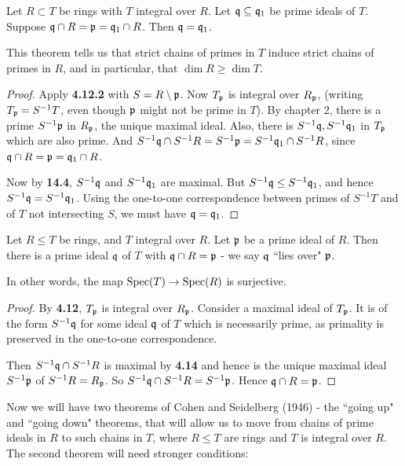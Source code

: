 \documentclass[10pt,a4paper]{article}
\begin{document}
\begin{theorem}
  Let $R \subset T$ be rings with $T$ integral over $R$. Let $\mathfrak{q} \subseteq \mathfrak{q}_1$ be prime ideals of $T$. Suppose $\mathfrak{q}\cap R = \mathfrak{p} = \mathfrak{q}_1 \cap R$. Then $\mathfrak{q}=\mathfrak{q}_1$.
\end{theorem}
This theorem tells us that strict chains of primes in $T$ induce strict chains of primes in $R$, and in particular, that $\dim R \geq \dim T$.
\begin{proof}
  Apply \textbf{4.12.2} with $S = R \setminus \mathfrak{p}$. Now $T_{\mathfrak{p}}$ is integral over $R_{\mathfrak{p}}$, (writing $T_{\mathfrak{p}} = S^{-1}T$, even though $\mathfrak{p}$ might not be prime in $T$). By chapter 2, there is a prime $S^{-1}\mathfrak{p}$ in $R_{\mathfrak{p}}$, the unique maximal ideal. Also, there is $S^{-1}\mathfrak{q}, S^{-1}\mathfrak{q}_1$ in $T_{\mathfrak{p}}$ which are also prime. And $S^{-1}\mathfrak{q}\cap S^{-1}R = S^{-1}\mathfrak{p} = S^{-1}\mathfrak{q}_1\cap S^{-1}R$, since $\mathfrak{q}\cap R =\mathfrak{p} = \mathfrak{q}_1 \cap R$.

  Now by \textbf{14.4}, $S^{-1}\mathfrak{q}$ and $S^{-1}\mathfrak{q}_1$ are maximal. But $S^{-1}\mathfrak{q} \leq S^{-1}\mathfrak{q}_1$, and hence $S^{-1}\mathfrak{q}= S^{-1}\mathfrak{q}_1$. Using the one-to-one correspondence between primes of $S^{-1}T$ and of $T$ not intersecting $S$, we must have $\mathfrak{q}=\mathfrak{q}_1$.
\end{proof}
\begin{theorem}
  Let $R \leq T$ be rings, and $T$ integral over $R$. Let $\mathfrak{p}$ be a prime ideal of $R$. Then there is a prime ideal $\mathfrak{q}$ of $T$ with $\mathfrak{q} \cap R =\mathfrak{p}$ - we say $\mathfrak{q}$ ``lies over" $\mathfrak{p}$.

  In other words, the map $\operatorname{Spec}(T) \to \operatorname{Spec}(R)$ is surjective.
\end{theorem}
\begin{proof}
  By \textbf{4.12}, $T_{\mathfrak{p}}$ is integral over $R_{\mathfrak{p}}$. Consider a maximal ideal of $T_{\mathfrak{p}}$. It is of the form $S^{-1}\mathfrak{q}$ for some ideal $\mathfrak{q}$ of $T$ which is necessarily prime, as primality is preserved in the one-to-one correspondence.

  Then $S^{-1}\mathfrak{q} \cap S^{-1}R$ is maximal by \textbf{4.14} and hence is the unique maximal ideal $S^{-1}\mathfrak{p}$ of $S^{-1}R = R_{\mathfrak{p}}$. So $S^{-1}\mathfrak{q}\cap S^{-1}R = S^{-1}\mathfrak{p}$. Hence $\mathfrak{q}\cap R = \mathfrak{p}$.
\end{proof}
Now we will have two theorems of Cohen and Seidelberg (1946) - the ``going up" and ``going down" theorems, that will allow us to move from chains of prime ideals in $R$ to such chains in $T$, where $R\leq T$ are rings and $T$ is integral over $R$. The second theorem will need stronger conditions:
\end{document}
